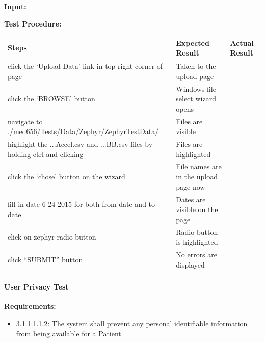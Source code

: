 \documentclass[letterpaper,10pt,english]{sphinxmanual}
\begin{document}
\textbf{Input:}

\textbf{Test Procedure:}

\begin{tabulary}{\linewidth}{|L|L|L|}
\hline
\textsf{\relax 
Steps
} & \textsf{\relax 
Expected Result
} & \textsf{\relax 
Actual Result
}\\
\hline
click the `Upload Data' link in top right corner of page
 & 
Taken to the upload page
 & \\
\hline
click the `BROWSE' button
 & 
Windows file select wizard opens
 & \\
\hline
navigate to ./med656/Tests/Data/Zephyr/ZephyrTestData/
 & 
Files are visible
 & \\
\hline
highlight the ...Accel.csv and ...BB.csv files by holding ctrl and clicking
 & 
Files are highlighted
 & \\
\hline
click the `chose' button on the wizard
 & 
File names are in the upload page now
 & \\
\hline
fill in date 6-24-2015 for both from date and to date
 & 
Dates are visible on the page
 & \\
\hline
click on zephyr radio button
 & 
Radio button is highlighted
 & \\
\hline
click ``SUBMIT'' button
 & 
No errors are displayed
 & \\
\hline\end{tabulary}



\paragraph{User Privacy Test}
\label{STD/manual_test_descriptions:user-privacy-test}
\textbf{Requirements:}
\begin{itemize}
\item {} 
3.1.1.1.1.2: The system shall prevent any personal identifiable information from being available for a Patient

\end{itemize}
\end{document}
